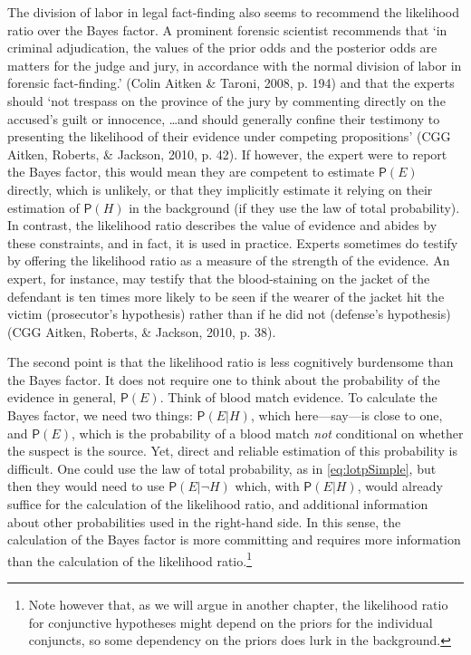 \documentclass[
  10pt,
  dvipsnames,enabledeprecatedfontcommands]{scrartcl}
\newcommand{\n}{\neg}
\newcommand{\pr}[1]{\mathsf{P}(#1)}
\begin{document}
The division of labor in legal fact-finding also seems to recommend the
likelihood ratio over the Bayes factor. A prominent forensic scientist
recommends that `in criminal adjudication, the values of the prior odds
and the posterior odds are matters for the judge and jury, in accordance
with the normal division of labor in forensic fact-finding.' (Colin
Aitken \& Taroni, 2008, p. 194) and that the experts should `not
trespass on the province of the jury by commenting directly on the
accused's guilt or innocence, \dots and should generally confine their
testimony to presenting the likelihood of their evidence under competing
propositions' (CGG Aitken, Roberts, \& Jackson, 2010, p. 42). If
however, the expert were to report the Bayes factor, this would mean
they are competent to estimate \(\pr{E}\) directly, which is unlikely,
or that they implicitly estimate it relying on their estimation of
\(\pr{H}\) in the background (if they use the law of total probability).
In contrast, the likelihood ratio describes the value of evidence and
abides by these constraints, and in fact, it is used in practice.
Experts sometimes do testify by offering the likelihood ratio as a
measure of the strength of the evidence. An expert, for instance, may
testify that the blood-staining on the jacket of the defendant is ten
times more likely to be seen if the wearer of the jacket hit the victim
(prosecutor's hypothesis) rather than if he did not (defense's
hypothesis) (CGG Aitken, Roberts, \& Jackson, 2010, p. 38).

The second point is that the likelihood ratio is less cognitively
burdensome than the Bayes factor. It does not require one to think about
the probability of the evidence in general, \(\pr{E}\). Think of blood
match evidence. To calculate the Bayes factor, we need two things:
\(\pr{E\vert H}\), which here---say---is close to one, and \(\pr{E}\),
which is the probability of a blood match \emph{not} conditional on
whether the suspect is the source. Yet, direct and reliable estimation
of this probability is difficult. One could use the law of total
probability, as in \eqref{eq:lotpSimple}, but then they would need to
use \(\pr{E\vert \n H}\) which, with \(\pr{E\vert H}\), would already
suffice for the calculation of the likelihood ratio, and additional
information about other probabilities used in the right-hand side. In
this sense, the calculation of the Bayes factor is more committing and
requires more information than the calculation of the likelihood
ratio.\footnote{Note however that, as we will argue in another chapter,
  the likelihood ratio for conjunctive hypotheses might depend on the
  priors for the individual conjuncts, so some dependency on the priors
  does lurk in the background.}
\end{document}
